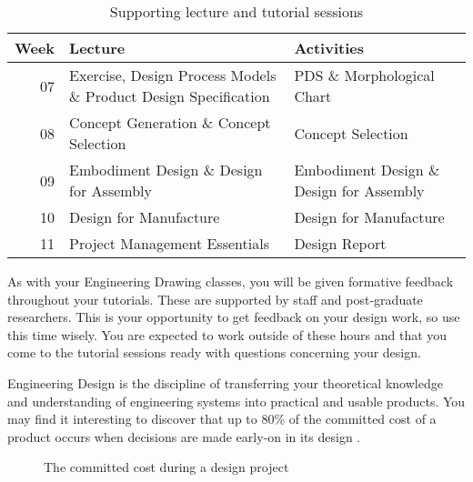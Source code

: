 \begin{table}[h!]
    \caption{Supporting lecture and tutorial sessions}
    \label{tbl-lectures}
    \centering
    \small
    \begin{tabular}{r p{} p{}}
        \toprule
        
        Week & Lecture & Activities \\
        
        \midrule

        07 & 
        Exercise, Design Process Models \& Product Design Specification & 
        PDS \& Morphological Chart \\
        
        08 & 
        Concept Generation \& Concept Selection 
        & Concept Selection \\
        
        09 & 
        Embodiment Design \& Design for Assembly & 
        Embodiment Design \& Design for Assembly \\
        
        10 & 
        Design for Manufacture & 
        Design for Manufacture \\
        
        11 & 
        Project Management Essentials & 
        Design Report \\

    \bottomrule
    \end{tabular}
\end{table}

As with your Engineering Drawing classes, you will be given formative feedback throughout your tutorials. These are supported by staff and post-graduate researchers. This is your opportunity to get feedback on your design work, so use this time wisely. You are expected to work outside of these hours and that you come to the tutorial sessions ready with questions concerning your design.

Engineering Design is the discipline of transferring your theoretical knowledge and understanding of engineering systems into practical and usable products. You may find it interesting to discover that up to 80\% of the committed cost of a product occurs when decisions are made early-on in its design .\cite{ullman2002}\cite{corbett1986}\cite{mileham1993}

\begin{figure}[t!]
    \centering
    
    \caption[The committed cost during a design project]{The committed cost during a design project~\citep{ullman2002}}
  \label{fig-committed}
\end{figure}

